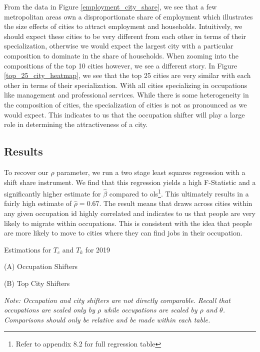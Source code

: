 \documentclass[10pt]{article}
\begin{document}
From the data in Figure \ref{employment_city_share}, we see that a few metropolitan areas own a disproportionate share of employment which illustrates the size effects of cities to attract employment and households. Intuitively, we should expect these cities to be very different from each other in terms of their specialization, otherwise we would expect the largest city with a particular composition to dominate in the share of households. When zooming into the compositions of the top 10 cities however, we see a different story. In Figure \ref{top_25_city_heatmap}, we see that the top 25 cities are very similar with each other in terms of their specialization. With all cities specializing in occupations like management and professional services. While there is some heterogeneity in the composition of cities, the specialization of cities is not as pronounced as we would expect. This indicates to us that the occupation shifter will play a large role in determining the attractiveness of a city.

\subsection{Results}

To recover our $\rho$ parameter, we run a two stage least squares regression with a shift share instrument. We find that this regression yields a high F-Statistic and a significantly higher estimate for $\hat{\beta}$ compared to ols\footnote{Refer to appendix 8.2 for full regression table}. This ultimately results in a fairly high estimate of $\hat{\rho} = 0.67$. The result means that draws across cities within any given occupation id highly correlated and indicates to us that people are very likely to migrate within occupations. This is consistent with the idea that people are more likely to move to cities where they can find jobs in their occupation.

\begin{table}[!htb]
    \centering
    \caption{Estimations for $T_c$ and $T_k$ for 2019}
    \begin{minipage}{0.4\textwidth}
        \centering
        \caption*{(A) Occupation Shifters}
        
    \end{minipage}
    \hfill
    \begin{minipage}{0.55\textwidth}
        \centering
        \caption*{(B) Top City Shifters}
        
    \end{minipage}
    \caption*{\small\textit{Note: Occupation and city shifters are not directly comparable. Recall that occupations are scaled only by $\rho$ while occupations are scaled by $\rho$ and $\theta$. Comparisons should only be relative and be made within each table.}}
\end{table}
\end{document}
